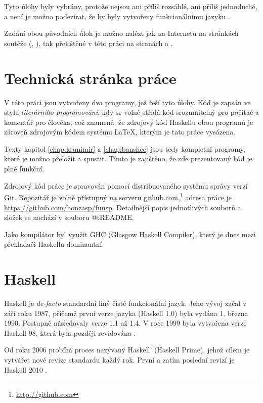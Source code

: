 Tyto úlohy byly vybrány, protože nejsou ani příliš rozsáhlé, ani příliš
jednoduché, a není je možno podezírat, že by byly vytvořeny funkcionálnímu jazyku
.

Zadání obou původních úloh je možno nalézt jak na Internetu na stránkách soutěže
(\cite{krunimir-task}, \cite{banshee-task}), tak přetištěné v této práci na
stranách \pageref{pdf:krunimir} a \pageref{pdf:banshee}.

\section{Technická stránka práce}

V této práci jsou vytvořeny dva programy, jež řeší tyto úlohy. Kód je zapsán ve
stylu \emph{literárního programování}, kdy se volně střídá kód srozumitelný pro
počítač a komentář pro člověka, což znamená, že zdrojový kód Haskellu obou
programů je zároveň zdrojovým kódem systému \LaTeX, kterým je tato práce
vysázena.

Texty kapitol \ref{chap:krunimir} a \ref{chap:banshee} jsou tedy kompletní
programy, které je možno přeložit a spustit. Tímto je zajištěno, že zde
prezentovaný kód je plně funkční.

Zdrojový kód práce je spravován pomocí distribuovaného systému správy verzí Git.
Repozitář je volně přístupný na serveru
\href{http://github.com}{github.com},\footnote{\url{http://github.com}} adresa
práce je \url{https://github.com/honzasp/funsp}. Detailnější popis jednotlivých
souborů a složek se nachází v souboru @t{README}.

Jako kompilátor byl využit GHC (Glasgow Haskell Compiler), který je dnes mezi
překladači Haskellu dominantní.

\section{Haskell}

Haskell je \textit{de-facto} standardní líný čistě funkcionální jazyk. Jeho
vývoj začal v září roku 1987, přičemž první verze jazyka (Haskell 1.0) byla
vydána 1. března 1990. Postupně následovaly verze 1.1 až 1.4. V roce 1999 byla
vytvořena  verze Haskell 98, která byla později revidována
\cite{jones2003haskell}. \cite{hudak2007history}

Od roku 2006 probíhá proces nazývaný Haskell' (Haskell Prime), jehož cílem je
vytvářet nové revize standardu každý rok. První a zatím poslední revizí je
Haskell 2010 \cite{haskellreport2010}.

